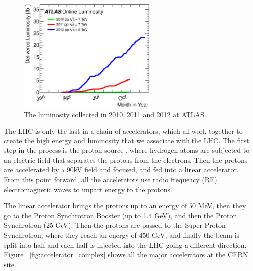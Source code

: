 \begin{figure}
	\centering
	\includegraphics[width=0.6\textwidth]{ATLASDetector/images/intlumivsyear.eps}
	\caption{The luminosity collected in 2010, 2011 and 2012 at ATLAS. \label{fig:lumi_vs_year}}
\end{figure}



The LHC is only the last in a chain of accelerators, which all work together to create the high 
energy and luminosity that we associate with the LHC.  The first step in the process is the proton source
, where hydrogen atoms are subjected to an electric field that separates the protons from the electrons.  Then the 
protons are accelerated by a 90kV field and focused, and fed into a linear accelerator.  From this point 
forward, all the accelerators use radio frequency (RF) electromagnetic waves to impart energy to the protons.  

The linear accelerator brings the protons up to an energy of 50 MeV, then they go to the Proton 
Synchrotron Booster (up to 1.4 GeV), and then the Proton Synchrotron (25 GeV).  Then 
the protons are passed to the Super Proton Synchrotron, where they reach an energy of 450 GeV, and 
finally the beam is split into half and each half is injected into the LHC going a different direction.  
Figure ~\ref{fig:accelerator_complex} shows all the major accelerators at the CERN site.



